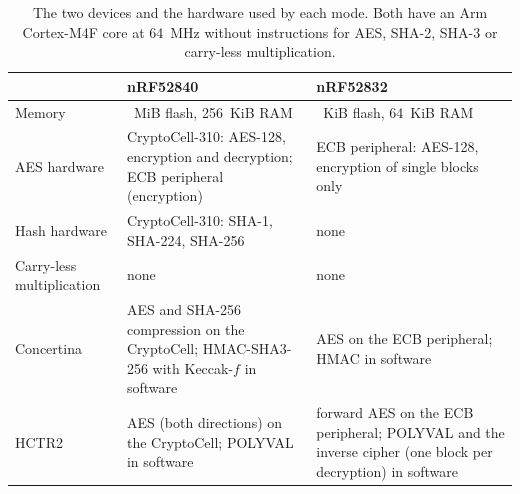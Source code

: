\begin{table}[!hbt]
\caption{The two devices and the hardware used by each mode. Both have an Arm
Cortex-M4F core at 64~MHz without instructions for AES, SHA-2, SHA-3 or
carry-less multiplication.}
\label{tab:mcu-devices}
\centering
\scriptsize
\renewcommand{\arraystretch}{1.25}
\setlength{\tabcolsep}{3pt}
\begin{tabular}{>{\raggedright\arraybackslash}p{1.9cm} >{\raggedright\arraybackslash}p{4.75cm} >{\raggedright\arraybackslash}p{4.75cm}}
\hline
 & nRF52840 & nRF52832 \\
\hline\hline
Memory & 1~MiB flash, 256~KiB RAM & 512~KiB flash, 64~KiB RAM \\
AES hardware & CryptoCell-310: AES-128, encryption and decryption; ECB
  peripheral (encryption) & ECB peripheral: AES-128, encryption of single
  blocks only \\
Hash hardware & CryptoCell-310: SHA-1, SHA-224, SHA-256 & none \\
Carry-less multiplication & none & none \\
\hline
Concertina & AES and SHA-256 compression on the CryptoCell; HMAC-SHA3-256 with
  Keccak-$f$ in software & AES on the ECB peripheral; HMAC in software \\
HCTR2 & AES (both directions) on the CryptoCell; POLYVAL in software &
  forward AES on the ECB peripheral; POLYVAL and the inverse cipher (one
  block per decryption) in software \\
\hline
\end{tabular}
\end{table}


